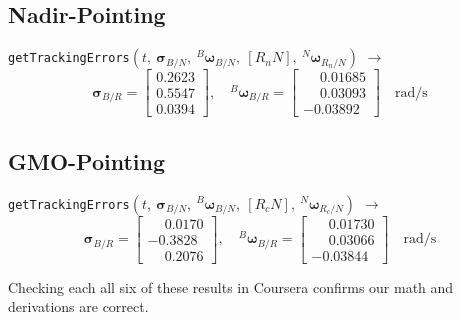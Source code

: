 \documentclass[conf]{new-aiaa}
\begin{document}
\subsection*{Nadir-Pointing}
\texttt{getTrackingErrors}\(\left(t,\ \bm{\sigma}_{B/N},\ {}^B\bm{\omega}_{B/N},\ [R_nN],\ {}^N\bm{\omega}_{R_n/N}\right)\) \(\rightarrow\)
\[
\bm\sigma_{B/R} =
\begin{bmatrix}
0.2623 \\ 0.5547 \\ 0.0394
\end{bmatrix}, \quad
{}^B\bm\omega_{B/R} =
\begin{bmatrix}
\phantom{-}0.01685 \\ \phantom{-}0.03093 \\ -0.03892
\end{bmatrix} \quad \text{rad/s}
\]

\subsection*{GMO-Pointing}
\texttt{getTrackingErrors}\(\left(t,\ \bm{\sigma}_{B/N},\ {}^B\bm{\omega}_{B/N},\ [R_cN],\ {}^N\bm{\omega}_{R_c/N}\right)\) \(\rightarrow\)
\[
\bm\sigma_{B/R} =
\begin{bmatrix}
\phantom{-}0.0170 \\ -0.3828 \\ \phantom{-}0.2076
\end{bmatrix}, \quad
{}^B\bm\omega_{B/R} =
\begin{bmatrix}
\phantom{-}0.01730 \\ \phantom{-}0.03066 \\ -0.03844
\end{bmatrix} \quad \text{rad/s}
\]

Checking each all six of these results in Coursera confirms our math and derivations are correct.
\end{document}
